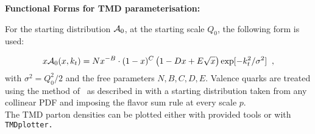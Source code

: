 \begin{description}
\vspace{0.1cm}
\item \bf {Functional Forms for TMD parameterisation:} \rm

For the starting distribution ${\cal A}_0$, at the starting scale $Q_0$, 
the following form is used:

{\small{ 
\begin{eqnarray}
x{\cal A}_0(x,\kt) = N x^{-B} \cdot (1 -x)^{C}\left( 1 -D x 
+ E \sqrt{x}   \right) 
   \exp[ - k_t^2 / \sigma^2 ]  \;\; , 
\label{a0-5par}
\end{eqnarray}}}with $ \sigma^2  =  Q_0^2 / 2 $ and the free parameters $N,B,C,D, E$.
Valence quarks are treated  using the method of~\cite{Deak:2010gk} as described 
in \cite{Hautmann:2013tba} with a starting distribution taken from any collinear PDF
and imposing the flavor sum rule at every scale $p$.
\\
The TMD parton densities can be plotted either with \fitter provided tools 
or with \tt TMDplotter\rm \cite{tmdlref}.

\end{description}



